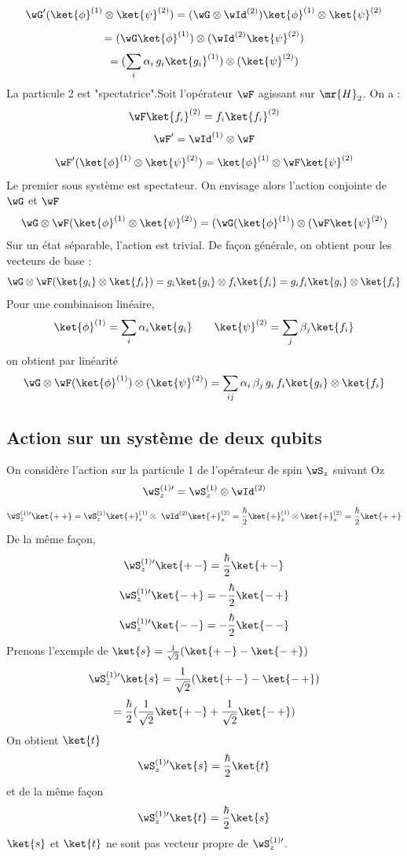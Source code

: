 \[
\wG'(\ket{\phi}^{(1)}\otimes\ket{\psi}^{(2)})=(\wG\otimes\wId^{(2)})
\ket{\phi}^{(1)}\otimes\ket{\psi}^{(2)}
\]
\[
=(\wG\ket{\phi}^{(1)})\otimes(\wId^{(2)}\ket{\psi}^{(2)})
\]
\[
=(\sum_i\alpha_i\,g_i\ket{g_i}^{(1)})\otimes(\ket{\psi}^{(2)})
\]
La particule 2 est "spectatrice".\qquad Soit l'opérateur $\wF$ agissant sur
$\mr{H}_2$. On a :
\[
\wF\ket{f_i}^{(2)}=f_i\ket{f_i}^{(2)}
\]
\[
\wF'=\wId^{(1)}\otimes\wF
\]
\[
\wF'(\ket{\phi}^{(1)}\otimes\ket{\psi}^{(2)})
=\ket{\phi}^{(1)}\otimes\wF\ket{\psi}^{(2)}
\]
Le premier sous système est spectateur. On envisage alors l'action conjointe de
$\wG$ et $\wF$
\[
\wG\otimes\wF(\ket{\phi}^{(1)}\otimes\ket{\psi}^{(2)})
=(\wG(\ket{\phi}^{(1)})\otimes(\wF\ket{\psi}^{(2)})
\]
Sur un état séparable, l'action est trivial. De façon générale, on obtient pour les vecteurs de base :
\[
\wG\otimes\wF(\ket{g_i}\otimes\ket{f_i}) = g_i\ket{g_i}\otimes f_i\ket{f_i}
=g_if_i\ket{g_i}\otimes\ket{f_i}
\]
Pour une combinaison linéaire,
\[
\ket{\phi}^{(1)}=\sum_i\alpha_i\ket{g_i}
\qquad\ket{\psi}^{(2)}=\sum_j\beta_j\ket{f_i}
\]
on obtient par linéarité
\[
\wG\otimes\wF(\ket{\phi}^{(1)})\otimes(\ket{\psi}^{(2)})
=\sum_{ij}\alpha_i\,\beta_j\,g_i\,f_i\ket{g_i}\otimes\ket{f_i}
\]
\subsection{Action sur un système de deux qubits}
On considère l'action sur la particule 1 de l'opérateur de spin $\wS_z$ suivant Oz
\[
\wS_z^{(1)\prime}=\wS_z^{(1)}\otimes\wId^{(2)}
\]
\[
\wS_z^{(1)\prime}\ket{+\,+}=\wS_z^{(1)}\ket{+}_z^{(1)}\otimes
\ \wId^{(2)}\ket{+}_z^{(2)}
=\frac{\hbar}{2}\ket{+}_z^{(1)}\otimes\ket{+}_z^{(2)}
=\frac{\hbar}{2}\ket{+\,+}
\]
De la même façon, 
\[
\wS_z^{(1)\prime}\ket{+\,-}=\frac{\hbar}{2}\ket{+\,-}
\]
\[
\wS_z^{(1)\prime}\ket{-\,+}=-\frac{\hbar}{2}\ket{-\,+}
\]
\[
\wS_z^{(1)\prime}\ket{-\,-}=-\frac{\hbar}{2}\ket{-\,-}
\]
Prenons l'exemple de $\ket{s}=\frac{1}{\sqrt{2}}(\ket{+\,-}-\ket{-\,+})$
\[
\wS_z^{(1)\prime}\ket{s}=\frac{1}{\sqrt{2}}(\ket{+\,-}-\ket{-\,+})
\]
\[
=\frac{\hbar}{2}(\frac{1}{\sqrt{2}}\ket{+\,-}+\frac{1}{\sqrt{2}}\ket{-\,+})
\]
On obtient $\ket{t}$
\[
\wS_z^{(1)\prime}\ket{s}=\frac{\hbar}{2}\ket{t}
\]
et de la même façon
\[
\wS_z^{(1)\prime}\ket{t}=\frac{\hbar}{2}\ket{s}
\]
$\ket{s}$ et $\ket{t}$ ne sont pas vecteur propre de $\wS_z^{(1)\prime}$.

